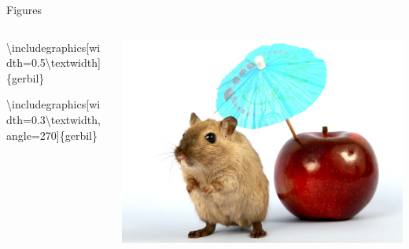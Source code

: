 \documentclass[,aspectratio=43]{beamer}
\newcommand{\VERB}{\Verb[commandchars=\\\{\}]}
\newenvironment{Shaded}{\begin{snugshade}}{\end{snugshade}}
\newcommand{\BuiltInTok}[1]{#1}
\newcommand{\ExtensionTok}[1]{#1}
\newcommand{\FunctionTok}[1]{\textcolor[rgb]{0.02,0.16,0.49}{#1}}
\newcommand{\NormalTok}[1]{#1}
\begin{document}
\begin{frame}[fragile]{Figures}

\begin{columns}[T]
\begin{column}{0.68\textwidth}
\small
\vspace{-1em}

\begin{Shaded}
\begin{Highlighting}[]
\BuiltInTok{\textbackslash{}includegraphics}\NormalTok{[width=0.5}\FunctionTok{\textbackslash{}textwidth}\NormalTok{]\{}\ExtensionTok{gerbil}\NormalTok{\}}





\BuiltInTok{\textbackslash{}includegraphics}\NormalTok{[width=0.3}\FunctionTok{\textbackslash{}textwidth}\NormalTok{,}
\NormalTok{                 angle=270]\{}\ExtensionTok{gerbil}\NormalTok{\}}
                 
                 
\end{Highlighting}
\end{Shaded}
\end{column}

\begin{column}{0.28\textwidth}
\includegraphics[width=\textwidth]{figure/gerbil}


\end{column}
\end{columns}
\end{frame}
\end{document}
